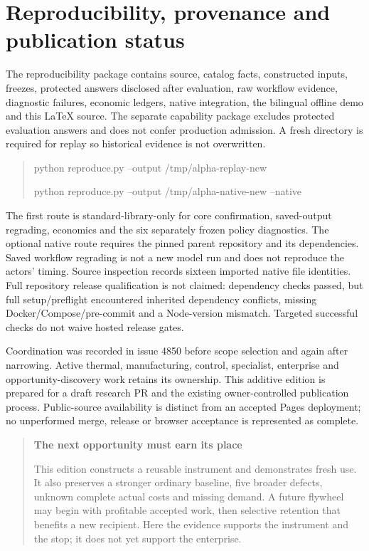 \documentclass[11pt]{article}
\begin{document}
\section{Reproducibility, provenance and publication status}
The reproducibility package contains source, catalog facts, constructed inputs, freezes, protected answers disclosed after evaluation, raw workflow evidence, diagnostic failures, economic ledgers, native integration, the bilingual offline demo and this LaTeX source. The separate capability package excludes protected evaluation answers and does not confer production admission. A fresh directory is required for replay so historical evidence is not overwritten.

\begin{quote}\small\ttfamily
python reproduce.py --output /tmp/alpha-replay-new\par
python reproduce.py --output /tmp/alpha-native-new --native
\end{quote}
The first route is standard-library-only for core confirmation, saved-output regrading, economics and the six separately frozen policy diagnostics. The optional native route requires the pinned parent repository and its dependencies. Saved workflow regrading is not a new model run and does not reproduce the actors' timing. Source inspection records sixteen imported native file identities. Full repository release qualification is not claimed: dependency checks passed, but full setup/preflight encountered inherited dependency conflicts, missing Docker/Compose/pre-commit and a Node-version mismatch. Targeted successful checks do not waive hosted release gates.

Coordination was recorded in issue 4850 before scope selection and again after narrowing. Active thermal, manufacturing, control, specialist, enterprise and opportunity-discovery work retains its ownership. This additive edition is prepared for a draft research PR and the existing owner-controlled publication process. Public-source availability is distinct from an accepted Pages deployment; no unperformed merge, release or browser acceptance is represented as complete.\cite{coordination}

\begin{quote}
\textbf{The next opportunity must earn its place}


This edition constructs a reusable instrument and demonstrates fresh use. It also preserves a stronger ordinary baseline, five broader defects, unknown complete actual costs and missing demand. A future flywheel may begin with profitable accepted work, then selective retention that benefits a new recipient. Here the evidence supports the instrument and the stop; it does not yet support the enterprise.
\end{quote}
\end{document}
